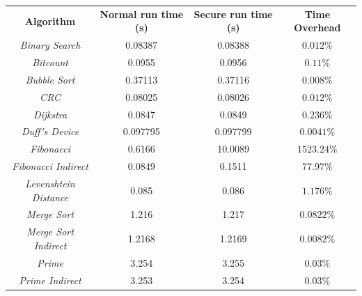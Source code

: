 \begin{table}
  \centering
  \begin{tabular}{|c|c|c|c|}
    \hline
    \textbf{Algorithm}                   & \textbf{Normal run time (s)} & \textbf{Secure run time (s)} & \textbf{Time Overhead} \\
    \hhline{====} \textit{Binary Search} & 0.08387                      & 0.08388                      & $0.012\%$              \\
    \hline
    \textit{Bitcount}                    & 0.0955                       & 0.0956                       & $0.11\%$               \\
    \hline
    \textit{Bubble Sort}                 & 0.37113                      & 0.37116                      & $0.008\%$              \\
    \hline
    \textit{CRC}                         & 0.08025                      & 0.08026                      & $0.012\%$              \\
    \hline
    \textit{Dijkstra}                    & 0.0847                       & 0.0849                       & $0.236\%$              \\
    \hline
    \textit{Duff's Device}               & 0.097795                     & 0.097799                     & $0.0041\%$             \\
    \hline
    \textit{Fibonacci}                   & 0.6166                       & 10.0089                      & $1523.24\%$            \\
    \hline
    \textit{Fibonacci Indirect}          & 0.0849                       & 0.1511                       & $77.97\%$              \\
    \hline
    \textit{Levenshtein Distance}        & 0.085                        & 0.086                        & $1.176\%$              \\
    \hline
    \textit{Merge Sort}                  & 1.216                        & 1.217                        & $0.0822\%$             \\
    \hline
    \textit{Merge Sort Indirect}         & 1.2168                       & 1.2169                       & $0.0082\%$             \\
    \hline
    \textit{Prime}                       & 3.254                        & 3.255                        & $0.03\%$               \\
    \hline
    \textit{Prime Indirect}              & 3.253                        & 3.254                        & $0.03\%$               \\

\end{tabular}
\end{table}
